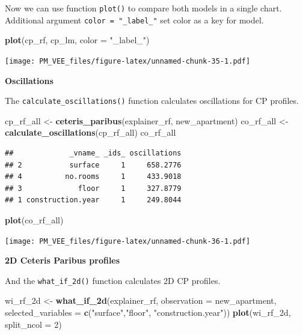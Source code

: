 \documentclass[]{krantz}
\newenvironment{Shaded}{\begin{snugshade}}{\end{snugshade}}
\newcommand{\DataTypeTok}[1]{\textcolor[rgb]{0.13,0.29,0.53}{#1}}
\newcommand{\DecValTok}[1]{\textcolor[rgb]{0.00,0.00,0.81}{#1}}
\newcommand{\KeywordTok}[1]{\textcolor[rgb]{0.13,0.29,0.53}{\textbf{#1}}}
\newcommand{\NormalTok}[1]{#1}
\newcommand{\StringTok}[1]{\textcolor[rgb]{0.31,0.60,0.02}{#1}}
\theoremstyle{definition}
\theoremstyle{definition}
\theoremstyle{definition}
\theoremstyle{remark}
\begin{document}
Now we can use function \texttt{plot()} to compare both models in a
single chart. Additional argument \texttt{color\ =\ "\_label\_"} set
color as a key for model.

\begin{Shaded}
\begin{Highlighting}[]
\KeywordTok{plot}\NormalTok{(cp_rf, cp_lm, }\DataTypeTok{color =} \StringTok{"_label_"}\NormalTok{)}
\end{Highlighting}
\end{Shaded}

\texttt{[image: PM\_VEE\_files/figure-latex/unnamed-chunk-35-1.pdf]}

\textbf{Oscillations}

The \texttt{calculate\_oscillations()} function calculates oscillations
for CP profiles.

\begin{Shaded}
\begin{Highlighting}[]
\NormalTok{cp_rf_all <-}\StringTok{ }\KeywordTok{ceteris_paribus}\NormalTok{(explainer_rf, new_apartment)}
\NormalTok{co_rf_all <-}\StringTok{ }\KeywordTok{calculate_oscillations}\NormalTok{(cp_rf_all)}
\NormalTok{co_rf_all}
\end{Highlighting}
\end{Shaded}

\begin{verbatim}
##             _vname_ _ids_ oscillations
## 2           surface     1     658.2776
## 4          no.rooms     1     433.9018
## 3             floor     1     327.8779
## 1 construction.year     1     249.8044
\end{verbatim}

\begin{Shaded}
\begin{Highlighting}[]
\KeywordTok{plot}\NormalTok{(co_rf_all)}
\end{Highlighting}
\end{Shaded}

\texttt{[image: PM\_VEE\_files/figure-latex/unnamed-chunk-36-1.pdf]}

\textbf{2D Ceteris Paribus profiles}

And the \texttt{what\_if\_2d()} function calculates 2D CP profiles.

\begin{Shaded}
\begin{Highlighting}[]
\NormalTok{wi_rf_2d <-}\StringTok{ }\KeywordTok{what_if_2d}\NormalTok{(explainer_rf, }\DataTypeTok{observation =}\NormalTok{ new_apartment, }
                 \DataTypeTok{selected_variables =} \KeywordTok{c}\NormalTok{(}\StringTok{"surface"}\NormalTok{,}\StringTok{"floor"}\NormalTok{, }\StringTok{"construction.year"}\NormalTok{))}
\KeywordTok{plot}\NormalTok{(wi_rf_2d, }\DataTypeTok{split_ncol =} \DecValTok{2}\NormalTok{)}
\end{Highlighting}
\end{Shaded}
\end{document}
